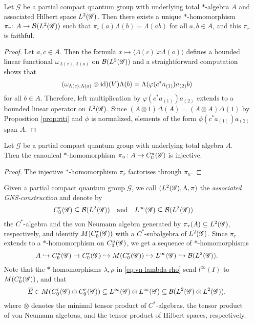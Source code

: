 \begin{Prop} \label{prop:gns} Let $\mathscr{G}$ be a partial compact
  quantum group with underlying total $*$-algebra $A$ and associated
  Hilbert space $L^{2}(\mathscr{G})$. Then there exists a unique $*$-homomorphism
  $\pi_{r}\colon A \to {\cal B}(L^{2}(\mathscr{G}))$ such that
  $\pi_{r}(a)\Lambda(b)=\Lambda(ab)$ for all $a,b\in A$, and this
  $\pi_{r}$ is faithful.
\end{Prop}
\begin{proof} 
  Let $a,c \in A$. Then the formula $x \mapsto \langle
\Lambda(c) | x\Lambda(a)\rangle$ defines a bounded linear functional
  $\omega_{\Lambda(c),\Lambda(a)}$ on ${\cal B}(L^{2}(\mathscr{G}))$ and a
  straightforward computation shows that
  \begin{align} \label{eq:vn-slice}
    (\omega_{\Lambda(c),\Lambda(a)}\otimes \operatorname{id})(V)\Lambda(b) =
    \Lambda(\varphi(c^*a_{(1)})a_{(2)}b)
  \end{align}
  for all $b\in A$. Therefore, left multiplication by
  $\varphi(c^*a_{(1)})a_{(2)}$ extends to a bounded linear operator on $L^{2}(\mathscr{G})$.
 Since $(A\otimes 1)\Delta(A) = (A\otimes
  A)\Delta(1)$ by Proposition \ref{prop:riti} and $\phi$ is
  normalized,  elements of the form $\phi(c^{*}a_{(1)})a_{(2)}$ span
  $A$. 
\end{proof}
\begin{Cor}
  Let $\mathscr{G}$ be a partial compact quantum group with underlying
  total algebra $A$. Then the
  canonical $*$-homomorphism $\pi_{u} \colon A \to C^{u}_{0}(\mathscr{G})$ is injective.
\end{Cor}
\begin{proof}
  The injective $*$-homomorphism $\pi_{r}$ factorises through
  $\pi_{u}$.
\end{proof}
Given a partial compact quantum group $\mathscr{G}$, we call
$(L^{2}(\mathscr{G}),\Lambda,\pi)$ the \emph{associated GNS-construction} and denote by
\begin{align}
  C^{r}_{0}(\mathscr{G}) &\subseteq {\cal B}(L^{2}(\mathscr{G})) &&\text{and} & L^{\infty}(\mathscr{G}) &\subseteq {\cal B}(L^{2}(\mathscr{G}))
\end{align}
the $C^{*}$-algebra and the von Neumann algebra generated by $\pi_{r}(A)
\subseteq L^{2}(\mathscr{G})$, respectively, and identify $M(C^{r}_{0}(\mathscr{G}))$ with a
$C^{*}$-subalgebra of $L^{2}(\mathscr{G})$.  Since $\pi_{r}$ extends to a
$*$-homomorphism on $C^{u}_{0}(\mathscr{G})$, we get a sequence of $*$-homomorphisms
\begin{align*}
A \hookrightarrow C^{u}_{0}(\mathscr{G}) \to 
  C^{r}_{0}(\mathscr{G}) \hookrightarrow M(C^{r}_{0}(\mathscr{G})) \hookrightarrow
L^{\infty}(\mathscr{G}) \hookrightarrow {\cal B}(L^{2}(\mathscr{G})).
\end{align*}
Note that
 the $*$-homomorphisms $\lambda,\rho$ in
\eqref{eq:vn-lambda-rho} send $l^{\infty}(I)$ to $M(C^{r}_{0}(\mathscr{G}))$, and that
\begin{align*}
  \overline{E} \in M(C^{r}_{0}(\mathscr{G}) \otimes C^{r}_{0}(\mathscr{G})) \subseteq L^{\infty}(\mathscr{G}) \otimes L^{\infty}(\mathscr{G})
  \subseteq {\cal B}(L^{2}(\mathscr{G}) \otimes L^{2}(\mathscr{G})),
\end{align*}
where $\otimes$ denotes the minimal tensor product
of $C^{*}$-algebras, the tensor product of von Neumann algebras, and
the tensor product of Hilbert spaces, respectively.

